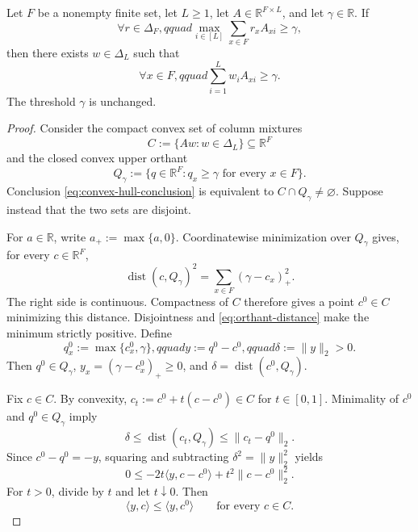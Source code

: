 \begin{lemma}
\label{lem:step-003-convex-hull-alternative}
Let $F$ be a nonempty finite set, let $L\ge1$, let
$A\in\mathbb R^{F\times L}$, and let $\gamma\in\mathbb R$.  If
\begin{equation}\label{eq:convex-hull-premise}
\forall r\in\Delta_F,qquad
\max_{i\in[L]}\sum_{x\in F}r_xA_{xi}\ge\gamma,
\end{equation}
then there exists $w\in\Delta_L$ such that
\begin{equation}\label{eq:convex-hull-conclusion}
\forall x\in F,qquad
\sum_{i=1}^Lw_iA_{xi}\ge\gamma.
\end{equation}
The threshold $\gamma$ is unchanged.
\end{lemma}

\begin{proof}
Consider the compact convex set of column mixtures
\[
C:=\{Aw:w\in\Delta_L\}\subseteq\mathbb R^F
\]
and the closed convex upper orthant
\[
Q_\gamma:=\{q\in\mathbb R^F:q_x\ge\gamma
\text{ for every }x\in F\}.
\]
Conclusion \eqref{eq:convex-hull-conclusion} is equivalent to
$C\cap Q_\gamma\ne\varnothing$.  Suppose instead that the two sets are
disjoint.

For $a\in\mathbb R$, write $a_+:=\max\{a,0\}$.  Coordinatewise
minimization over $Q_\gamma$ gives, for every $c\in\mathbb R^F$,
\begin{equation}\label{eq:orthant-distance}
\operatorname{dist}(c,Q_\gamma)^2
=\sum_{x\in F}(\gamma-c_x)_+^2.
\end{equation}
The right side is continuous.  Compactness of $C$ therefore gives a point
$c^0\in C$ minimizing this distance.  Disjointness and
\eqref{eq:orthant-distance} make the minimum strictly positive.  Define
\begin{equation}\label{eq:closest-point-objects}
q_x^0:=\max\{c_x^0,\gamma\},qquad
y:=q^0-c^0,qquad
\delta:=\lVert y\rVert_2>0.
\end{equation}
Then $q^0\in Q_\gamma$,
$y_x=(\gamma-c_x^0)_+\ge0$, and
$\delta=\operatorname{dist}(c^0,Q_\gamma)$.

Fix $c\in C$.  By convexity,
$c_t:=c^0+t(c-c^0)\in C$ for $t\in[0,1]$.  Minimality of $c^0$ and
$q^0\in Q_\gamma$ imply
\[
\delta\le\operatorname{dist}(c_t,Q_\gamma)
\le\lVert c_t-q^0\rVert_2.
\]
Since $c^0-q^0=-y$, squaring and subtracting
$\delta^2=\lVert y\rVert_2^2$ yields
\[
0\le-2t\langle y,c-c^0\rangle
+t^2\lVert c-c^0\rVert_2^2.
\]
For $t>0$, divide by $t$ and let $t\downarrow0$.  Then
\begin{equation}\label{eq:closest-point-support}
\langle y,c\rangle\le\langle y,c^0\rangle
\qquad\text{for every }c\in C.
\end{equation}


\end{proof}

